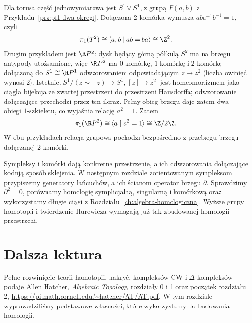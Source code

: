\begin{przyklad}
\label{prz:pi1-torus-rp2}
Dla torusa część jednowymiarowa
jest $S^1\vee S^1$, z grupą
$F(a,b)$ z Przykładu~\ref{prz:pi1-dwa-okregi}.
Dołączona $2$-komórka wymusza
$aba^{-1}b^{-1}=1$, czyli
\[
 \pi_1(T^2)\cong
 \langle a,b\mid ab=ba\rangle
 \cong\Z^2.
\]
Drugim przykładem jest
$\R P^2$: dysk będący górną
półkulą $S^2$ ma na brzegu
antypody utożsamione, więc
$\R P^2$ ma $0$-komórkę,
      $1$-komórkę i $2$-komórkę
      dołączoną do $S^1\cong\R P^1$
      odwzorowaniem odpowiadającym
      $z\mapsto z^2$ (liczba owinięć wynosi $2$).
      Istotnie, $S^1/(z\sim-z)\to S^1$, $[z]\mapsto z^2$,
      jest homeomorfizmem jako ciągła bijekcja ze zwartej
      przestrzeni do przestrzeni Hausdorffa; odwzorowanie dołączające
      przechodzi przez ten iloraz. Pełny obieg brzegu daje zatem dwa obiegi
      $1$-szkieletu, co wyjaśnia relację $a^2=1$.
      Zatem
\[
 \pi_1(\R P^2)
 \cong\langle a\mid a^2=1\rangle
 \cong\Z/2\Z.
\]
W obu przykładach relacja grupowa pochodzi bezpośrednio
z przebiegu brzegu dołączanej $2$-komórki.
\end{przyklad}

\begin{uwaga}
Sympleksy i komórki dają
konkretne przestrzenie, a ich
odwzorowania dołączające kodują sposób
sklejenia. W następnym rozdziale
zorientowanym sympleksom przypiszemy
generatory łańcuchów, a ich ścianom
operator brzegu $\partial$.
Sprawdzimy $\partial^2=0$,
porównamy homologię symplicjalną,
singularną i komórkową oraz
wykorzystamy długie ciągi
z Rozdziału~\ref{ch:algebra-homologiczna}.
Wyższe grupy homotopii i twierdzenie
Hurewicza wymagają już tak
zbudowanej homologii przestrzeni.
\end{uwaga}

\section*{Dalsza lektura}
Pełne rozwinięcie teorii homotopii,
nakryć, kompleksów CW i
$\Delta$-kompleksów podaje
Allen Hatcher, \emph{Algebraic Topology},
rozdziały 0 i 1 oraz początek rozdziału 2,
\url{https://pi.math.cornell.edu/~hatcher/AT/AT.pdf}.
W tym rozdziale wyprowadziliśmy
podstawowe własności, które
wykorzystamy do budowania homologii.

\clearpage


